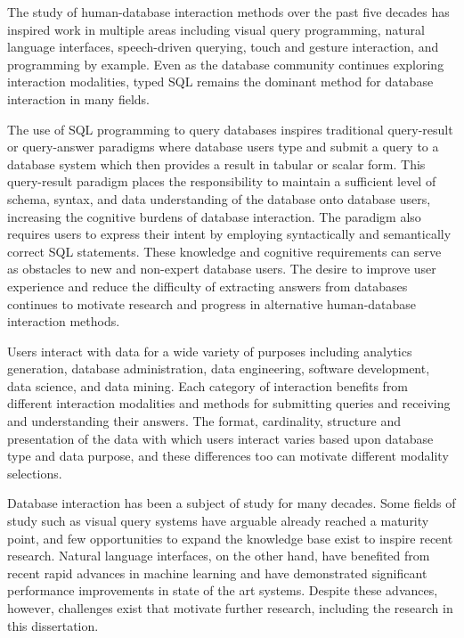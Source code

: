 
The study of human-database interaction methods over the past five decades has inspired work in multiple areas including visual query programming, natural language interfaces, speech-driven querying, touch and gesture interaction, and programming by example. 
Even as the database community continues exploring interaction modalities, typed SQL remains the dominant method for database interaction in many fields.

The use of SQL programming to query databases inspires traditional query-result or query-answer paradigms \cite{10.14778/3402755.3402797, 8509430} where database users type and submit a query to a database system which then provides a result in tabular or scalar form. 
This query-result paradigm places the responsibility to maintain a sufficient level of schema, syntax, and data understanding of the database onto database users, increasing the cognitive burdens of database interaction. 
The paradigm also requires users to express their intent by employing syntactically and semantically correct SQL statements. 
These knowledge and cognitive requirements can serve as obstacles to new and non-expert database users. 
The desire to improve user experience and reduce the difficulty of extracting answers from databases continues to motivate research and progress in alternative human-database interaction methods.

Users interact with data for a wide variety of purposes including analytics generation, database administration, data engineering, software development, data science, and data mining. 
Each category of interaction benefits from different interaction modalities and methods for submitting queries and receiving and understanding their answers. 
The format, cardinality, structure and presentation of the data with which users interact varies based upon database type and data purpose, and these differences too can motivate different modality selections.

Database interaction has been a subject of study for many decades. Some fields of study such as visual query systems have arguable already reached a maturity point, and few opportunities to expand the knowledge base exist to inspire recent research. Natural language interfaces, on the other hand, have benefited from recent rapid advances in machine learning and have demonstrated significant performance improvements in state of the art systems. Despite these advances, however, challenges exist that motivate further research, including the research in this dissertation.


